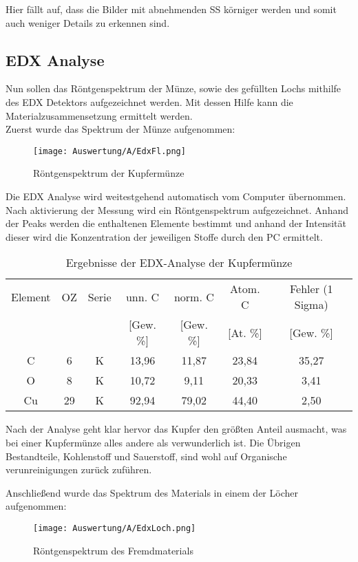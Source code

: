 Hier fällt auf, dass die Bilder mit abnehmenden SS körniger werden und somit auch weniger Details zu erkennen sind.

\newpage
\subsection*{EDX Analyse}

Nun sollen das Röntgenspektrum der Münze, sowie des gefüllten Lochs mithilfe des EDX Detektors aufgezeichnet werden. Mit dessen Hilfe kann die Materialzusammensetzung ermittelt werden. \\

Zuerst wurde das Spektrum der Münze aufgenommen: 
\begin{figure}[h]
    \centering
    \texttt{[image: Auswertung/A/EdxFl.png]}
    \caption{Röntgenspektrum der Kupfermünze}
\end{figure}

Die EDX Analyse wird weitestgehend automatisch vom Computer übernommen. Nach aktivierung der Messung wird ein Röntgenspektrum aufgezeichnet. Anhand der Peaks werden die enthaltenen Elemente bestimmt und anhand der Intensität dieser wird die Konzentration der jeweiligen Stoffe durch den PC ermittelt.

\begin{table}[h]
    \centering
    \begin{tabular}{c|c|c|c|c|c|c}
        Element & OZ &Serie& unn. C & norm. C &  Atom. C  & Fehler (1 Sigma) \\
         & & & [Gew. \%] & [Gew. \%] & [At. \%] & [Gew. \%] \\
        \hline\hline
        C & 6 & K & 13,96&11,87&23,84 & 35,27\\
        O & 8 & K & 10,72&9,11&20,33 & 3,41\\
        Cu & 29 & K & 92,94&79,02&44,40 & 2,50\\
    \end{tabular}
    \caption{Ergebnisse der EDX-Analyse der Kupfermünze}
\end{table}

Nach der Analyse geht klar hervor das Kupfer den größten Anteil ausmacht, was bei einer Kupfermünze alles andere als verwunderlich ist. Die Übrigen Bestandteile, Kohlenstoff und Sauerstoff, sind wohl auf Organische verunreinigungen zurück zuführen.

\newpage
Anschließend wurde das Spektrum des Materials in einem der Löcher aufgenommen: 
\begin{figure}[h]
    \centering
    \texttt{[image: Auswertung/A/EdxLoch.png]}
    \caption{Röntgenspektrum des Fremdmaterials}
\end{figure}


